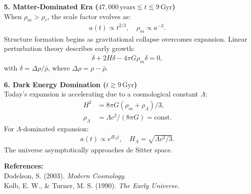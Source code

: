 \begin{technical}
\noindent\textbf{5. Matter-Dominated Era \boldmath(\( 47{,}000 \, \text{years} \lesssim t \lesssim 9\,\text{Gyr} \))}\\[0.3em]
When \(\rho_m > \rho_r\), the scale factor evolves as:
\begin{align*}
a(t) \propto t^{2/3}, \quad \rho_m \propto a^{-3}.
\end{align*}
Structure formation begins as gravitational collapse overcomes expansion. Linear perturbation theory describes early growth:
\[
\ddot{\delta} + 2 H \dot{\delta} - 4\pi G \rho_m \delta = 0,
\]
with \(\delta = \Delta\rho/\bar{\rho}\), where \(\Delta\rho = \rho - \bar{\rho}\).

\noindent\textbf{6. Dark Energy Domination \boldmath(\( t \gtrsim 9\,\text{Gyr} \))}\\[0.3em]
Today's expansion is accelerating due to a cosmological constant \(\Lambda\):
\begin{align*}
H^2 &= 8\pi G (\rho_m + \rho_\Lambda)/3, \\
\rho_\Lambda &= \Lambda c^2/(8\pi G) = \text{const.}
\end{align*}
For \(\Lambda\)-dominated expansion:
\begin{align*}
a(t) \propto e^{H_\Lambda t}, \quad H_\Lambda = \sqrt{\Lambda c^2/3}.
\end{align*}
The universe asymptotically approaches de Sitter space.

\vspace{0.3em}
\noindent\textbf{References:}\\
{\footnotesize
Dodelson, S. (2003). \textit{Modern Cosmology}.\\
Kolb, E. W., \& Turner, M. S. (1990). \textit{The Early Universe}.\\
}
\end{technical}
